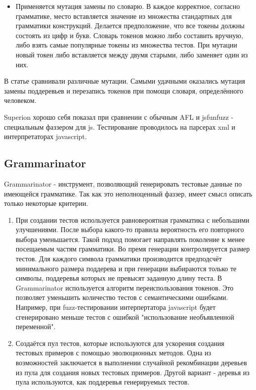 \documentclass[a4paper]{article}
\begin{document}
\begin{enumerate}
\begin{itemize}
        \item Применяется мутация замены по словарю. В каждое корректное, согласно грамматике, место вставляется значение из множества стандартных для грамматики конструкций. Делается предположение, что все токены должны состоять из цифр и букв. Словарь токенов можно либо составить вручную, либо взять самые популярные токены из множества тестов. При мутации новый токен либо вставляется между двумя старыми, либо заменяет один из них.
    \end{itemize}
    В статье сравнивали различные мутации. Самыми удачными оказались мутация замены поддеревьев и перезапись токенов при помощи словаря, определённого человеком.
\end{enumerate}
Superion хорошо себя показал при сравнении с обычным AFL и jsfunfuzz - специальным фаззером для js. Тестирование проводилось на парсерах xml и интерпретаторах javascript.

\subsection{Grammarinator}
\indent

Grammarinator\cite{litlink5} - инструмент, позволяющий генерировать тестовые данные по имеющейся грамматике. Так как это неполноценный фаззер, имеет смысл описать только некоторые критерии.

\begin{enumerate}
\item При создании тестов используется равновероятная грамматика с небольшими улучшениями. После выбора какого-то правила вероятность его повторного выбора уменьшается. Такой подход помогает направлять
поколение к менее посещаемым частям грамматики. Во премя генерации контролируется размер тестов. Для каждого символа грамматики производится предподсчёт минимального размера поддерева и при генерации выбираются только те символы, поддеревья которых не превысят заданную длину теста. В Grammarinator используется алгоритм переиспользования токенов. Это позволяет уменьшить количество тестов с семантическими ошибками. Например, при fuzz-тестировании интерпертатора javascript будет сгенерировано меньше тестов с ошибкой "использование необъявленной переменной".
\item Создаётся пул тестов, которые используются для ускорения создания тестовых примеров с помощью эволюционных методов. Одна из возможностей заключается в выполнении случайной рекомбинации деревьев из пула для создания новых тестовых примеров. Другой вариант - деревья из пула используются, как поддеревья генерируемых тестов.
\end{enumerate}
\end{document}
